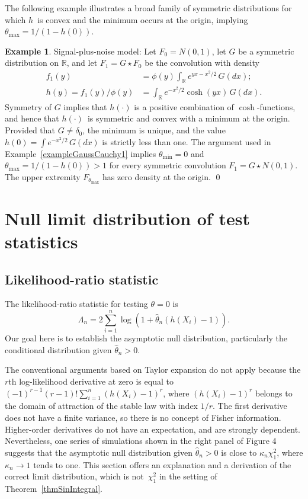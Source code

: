 \documentclass[11pt]{article}
\theoremstyle{definition}
\newtheorem{example}{Example}[section]
\newcommand{\RR}{\mathbb{R}}
\begin{document}
The following example illustrates a broad family of symmetric distributions 
for which $h$~is convex and the minimum occurs at the origin, implying $\theta_{\max} = 1/(1 - h(0))$.


\begin{example}\label{exampleConvol}
	Signal-plus-noise model:
	Let $F_0 = N(0,1)$, let $G$ be a symmetric distribution on $\RR$, and let $F_1 = G \star F_0$ be the convolution with density
	\begin{align*}
		f_1(y) &= \phi(y) \int_\RR e^{y x - x^2\!/2}\, G(dx); \\
		h(y) = f_1(y)/\phi(y) &= \int_\RR e^{-x^2\!/2} \cosh(yx)\, G(dx).
	\end{align*}
	Symmetry of $G$ implies that $h(\cdot)$ is a positive combination of $\cosh$-functions,
	and hence that $h(\cdot)$~is symmetric and convex with a minimum at the origin.
	Provided that $G \neq \delta_0$, the minimum is unique, and the value $h(0) = \int e^{-x^2\!/2} \, G(dx)$ is strictly less than one.
	The argument used in Example~\ref{exampleGaussCauchy1} implies $\theta_{\text{min}} = 0$
	and $\theta_{\text{max}} = 1/(1 - h(0)) > 1$ for every symmetric convolution $F_1 = G\star N(0,1)$.
	The upper extremity $F_{\theta_{\text{max}}}$ has zero density at the origin. \qed
\end{example}

\section{Null limit distribution of test statistics}

\subsection{Likelihood-ratio statistic}\label{L-R_limit}
The likelihood-ratio statistic for testing $\theta = 0$ is
\[
\Lambda_n=2\sum_{i=1}^n \log(1+\hat\theta_n(h(X_i)-1)).
\]
Our goal here is to establish the asymptotic null distribution, particularly the conditional distribution given $\hat\theta_n > 0$.

The conventional arguments based on Taylor expansion \citep[see Appendices A.1 and A.3 of][]{Brazzale} do not apply because the $r$th log-likelihood derivative at zero is equal to $(-1)^{r-1}(r-1)!\sum_{i=1}^n(h(X_i)-1)^r$, where $(h(X_i)-1)^r$ belongs to the domain of attraction of the stable law with index $1/r$. The first derivative does not have a finite variance, so there is no concept of Fisher information.  Higher-order derivatives do not have an expectation, and are strongly dependent. 
Nevertheless, one series of simulations shown in the right panel of Figure 4 suggests that the asymptotic null distribution given $\hat\theta_n > 0$ is close to $\kappa_n \chi_1^2$, where  $\kappa_n \to 1$ tends to one. This section offers an explanation and a derivation of the correct limit distribution,
which is not~$\chi_1^2$ in the setting of Theorem~\ref{thmSinIntegral}.
\end{document}
